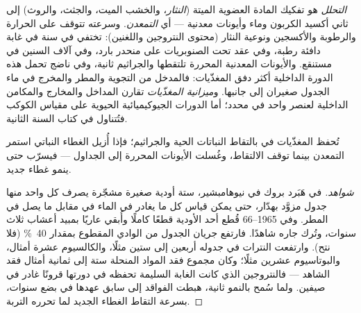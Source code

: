 \begin{definition}\label{def:b1:ecosystem-dynamics:decomposition}
\emph{التحلل} هو تفكيك المادة العضوية الميتة
(\emph{النثار}، والخشب الميت، والجثث، والروث) 
 إلى ثاني أكسيد الكربون وماء وأيونات معدنية ---
أي \emph{التمعدن}. وسرعته تتوقف على الحرارة والرطوبة
والأكسجين ونوعية النثار (محتوى النتروجين واللغنين): 
تختفي في سنة في غابة دافئة رطبة، وفي عقد تحت الصنوبريات
على منحدر بارد، وفي آلاف السنين في مستنقع. والأيونات المعدنية
المحررة تلتقطها  والجراثيم ثانية، وفي  ناضج
تحمل هذه الدورة الداخلية أكثر دفق المغذّيات: فالمدخل من
التجوية والمطر والمخرج في ماء الجدول صغيران إلى جانبها.
و\emph{ميزانية المغذّيات} تقارن المداخل والمخارج والمكامن
الداخلية لعنصر واحد في  محدد؛ أما الدورات
الجيوكيميائية الحيوية على مقياس الكوكب فتُتناول في كتاب السنة الثانية.
\end{definition}

\begin{proposition}\label{prop:b1:ecosystem-dynamics:retention}
تُحفظ المغذّيات في  بالتقاط النباتات الحية
والجراثيم؛ فإذا أُزيل الغطاء النباتي استمر التمعدن
بينما توقف الالتقاط، وغُسلت الأيونات المحررة إلى
الجداول --- فيسرّب  حتى ينمو غطاء جديد.
\end{proposition}
\begin{proof}[شواهد]
في هَبَرد بروك في نيوهامبشير، ستة أودية صغيرة مشجّرة
يصرف كل واحد منها جدول مزوَّد بهدّار، حتى يمكن قياس كل ما
يغادر في الماء في مقابل ما يصل في
المطر. وفي 1965--66 قُطع أحد الأودية قطعًا كاملًا وأُبقي عاريًا
بمبيد أعشاب ثلاث سنوات، وتُرك جاره شاهدًا. فارتفع جريان
الجدول من الوادي المقطوع بمقدار \qty{40}{\%} (فلا نتح).
وارتفعت النترات في جدوله أربعين إلى ستين مثلًا، والكالسيوم عشرة أمثال،
والبوتاسيوم عشرين مثلًا؛ وكان مجموع فقد المواد المنحلة ستة
إلى ثمانية أمثال فقد الشاهد --- فالنتروجين الذي كانت الغابة السليمة
تحفظه في دورتها قرونًا غادر في صيفين. ولما سُمح
بالنمو ثانية، هبطت الفواقد إلى سابق عهدها في بضع سنوات،
بسرعة التقاط الغطاء الجديد لما تحرره التربة.
\end{proof}

